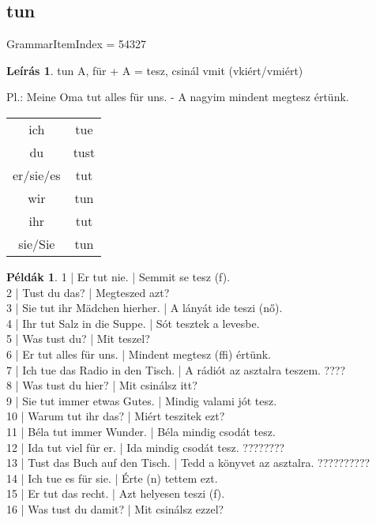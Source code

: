 \documentclass{article}
\theoremstyle{definition}
\newtheorem*{exmp}{Példák}
\newtheorem*{desc}{Leírás}
\begin{document}
\subsection{tun}

GrammarItemIndex = 54327

\begin{desc}
tun A, für + A = tesz, csinál vmit (vkiért/vmiért)

Pl.: Meine Oma tut alles für uns. - A nagyim mindent megtesz értünk.

\begin{tabular}{cc}
 ich & tue \\
 du & tust \\
 er/sie/es & tut \\
 wir & tun \\
 ihr & tut \\
 sie/Sie & tun \\
\end{tabular}
\end{desc}

\begin{exmp}
1 | Er tut nie. | Semmit se tesz (f).\\
2 | Tust du das? | Megteszed azt?\\
3 | Sie tut ihr Mädchen hierher. | A lányát ide teszi (nő).\\
4 | Ihr tut Salz in die Suppe. | Sót tesztek a levesbe.\\
5 | Was tust du? | Mit teszel?\\
6 | Er tut alles für uns. | Mindent megtesz (ffi) értünk.\\
7 | Ich tue das Radio in den Tisch. | A rádiót az asztalra teszem. ????\\
8 | Was tust du hier? | Mit csinálsz itt?\\
9 | Sie tut immer etwas Gutes. | Mindig valami jót tesz.\\
10 | Warum tut ihr das? | Miért teszitek ezt?\\
11 | Béla tut immer Wunder. | Béla mindig csodát tesz.\\
12 | Ida tut viel für er. | Ida mindig csodát tesz. ????????\\
13 | Tust das Buch auf den Tisch. | Tedd a könyvet az asztalra. ??????????\\
14 | Ich tue es für sie. | Érte (n) tettem ezt.\\
15 | Er tut das recht. | Azt helyesen teszi (f).\\
16 | Was tust du damit? | Mit csinálsz ezzel?\\
\end{exmp}
\end{document}
